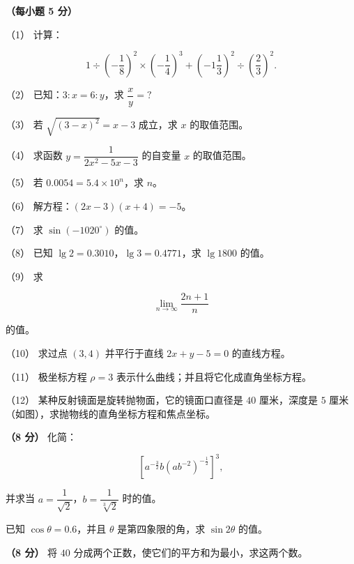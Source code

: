 \Needspace{0.4\textheight}
\begin{question}
\textbf{（每小题 5 分）} 

（1） 计算：

\nopagebreak[4]
\[
1\div\left(-\frac18\right)^2\times\left(-\frac14\right)^3+\left(-1\frac13\right)^2\div\left(\frac23\right)^2.
\]

（2） 已知：$3:x=6:y$，求 $\dfrac{x}{y}=?$

（3） 若 $\sqrt{(3-x)^2}=x-3$ 成立，求 $x$ 的取值范围。

（4） 求函数 $y=\dfrac{1}{2x^2-5x-3}$ 的自变量 $x$ 的取值范围。

（5） 若 $0.0054=5.4\times10^n$，求 $n$。

（6） 解方程：$(2x-3)(x+4)=-5$。

（7） 求 $\sin(-1020^\circ)$ 的值。

（8） 已知 $\lg2=0.3010$，$\lg3=0.4771$，求 $\lg1800$ 的值。

（9） 求

\nopagebreak[4]
\[
\lim_{n\to\infty}\frac{2n+1}{n}
\]

的值。

（10） 求过点 $(3,4)$ 并平行于直线 $2x+y-5=0$ 的直线方程。

（11） 极坐标方程 $\rho=3$ 表示什么曲线；并且将它化成直角坐标方程。

（12） 某种反射镜面是旋转抛物面，它的镜面口直径是 $40$ 厘米，深度是 $5$ 厘米（如图），求抛物线的直角坐标方程和焦点坐标。
\nopagebreak[4]
\begin{center}\end{center}
\nopagebreak[4]
\end{question}
\begin{question}
\textbf{（8 分）} 化简：

\nopagebreak[4]
\[
\left[a^{-\frac32}b\left(ab^{-2}\right)^{-\frac12}\right]^3,
\]

并求当 $a=\dfrac{1}{\sqrt2}$，$b=\dfrac{1}{\sqrt[3]2}$ 时的值。

\end{question}
\begin{question}
已知 $\cos\theta=0.6$，并且 $\theta$ 是第四象限的角，求 $\sin2\theta$ 的值。

\end{question}
\begin{question}
\textbf{（8 分）} 将 $40$ 分成两个正数，使它们的平方和为最小，求这两个数。

\end{question}
